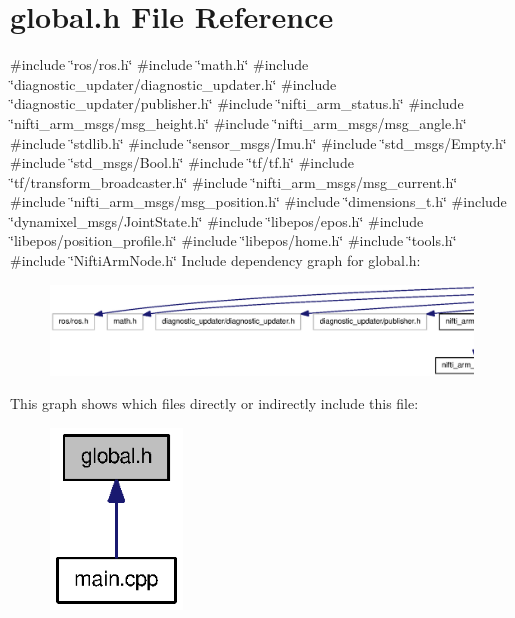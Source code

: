 \section{global.\-h \-File \-Reference}
\label{global_8h}
{\ttfamily \#include \char`\"{}ros/ros.\-h\char`\"{}}\*
{\ttfamily \#include \char`\"{}math.\-h\char`\"{}}\*
{\ttfamily \#include \char`\"{}diagnostic\-\_\-updater/diagnostic\-\_\-updater.\-h\char`\"{}}\*
{\ttfamily \#include \char`\"{}diagnostic\-\_\-updater/publisher.\-h\char`\"{}}\*
{\ttfamily \#include \char`\"{}nifti\-\_\-arm\-\_\-status.\-h\char`\"{}}\*
{\ttfamily \#include \char`\"{}nifti\-\_\-arm\-\_\-msgs/msg\-\_\-height.\-h\char`\"{}}\*
{\ttfamily \#include \char`\"{}nifti\-\_\-arm\-\_\-msgs/msg\-\_\-angle.\-h\char`\"{}}\*
{\ttfamily \#include \char`\"{}stdlib.\-h\char`\"{}}\*
{\ttfamily \#include \char`\"{}sensor\-\_\-msgs/\-Imu.\-h\char`\"{}}\*
{\ttfamily \#include \char`\"{}std\-\_\-msgs/\-Empty.\-h\char`\"{}}\*
{\ttfamily \#include \char`\"{}std\-\_\-msgs/\-Bool.\-h\char`\"{}}\*
{\ttfamily \#include \char`\"{}tf/tf.\-h\char`\"{}}\*
{\ttfamily \#include \char`\"{}tf/transform\-\_\-broadcaster.\-h\char`\"{}}\*
{\ttfamily \#include \char`\"{}nifti\-\_\-arm\-\_\-msgs/msg\-\_\-current.\-h\char`\"{}}\*
{\ttfamily \#include \char`\"{}nifti\-\_\-arm\-\_\-msgs/msg\-\_\-position.\-h\char`\"{}}\*
{\ttfamily \#include \char`\"{}dimensions\-\_\-t.\-h\char`\"{}}\*
{\ttfamily \#include \char`\"{}dynamixel\-\_\-msgs/\-Joint\-State.\-h\char`\"{}}\*
{\ttfamily \#include \char`\"{}libepos/epos.\-h\char`\"{}}\*
{\ttfamily \#include \char`\"{}libepos/position\-\_\-profile.\-h\char`\"{}}\*
{\ttfamily \#include \char`\"{}libepos/home.\-h\char`\"{}}\*
{\ttfamily \#include \char`\"{}tools.\-h\char`\"{}}\*
{\ttfamily \#include \char`\"{}\-Nifti\-Arm\-Node.\-h\char`\"{}}\*
\-Include dependency graph for global.\-h\-:
\nopagebreak
\begin{figure}[H]
\begin{center}
\leavevmode
\includegraphics[width=350pt]{global_8h__incl}
\end{center}
\end{figure}
\-This graph shows which files directly or indirectly include this file\-:
\nopagebreak
\begin{figure}[H]
\begin{center}
\leavevmode
\includegraphics[width=100pt]{global_8h__dep__incl}
\end{center}
\end{figure}
